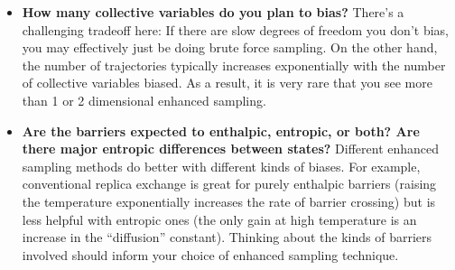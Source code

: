 \begin{itemize}
    \item \textbf{How many collective variables do you plan to bias?} There's a
    challenging tradeoff here: If there are slow degrees of freedom you don't
    bias, you may effectively just be doing brute force sampling.  On the other
    hand, the number of trajectories typically increases exponentially with the
    number of collective variables biased.  As a result, it is very rare that you see more than 1 or 2 dimensional enhanced sampling.

    \item \textbf{Are the barriers expected to enthalpic, entropic, or both? Are
    there major entropic differences between states?}  Different enhanced
    sampling methods do better with different kinds of biases.  For example,
    conventional replica exchange is great for purely enthalpic barriers
    (raising the temperature exponentially increases the rate of barrier
    crossing) but is less helpful with entropic ones (the only gain at high
    temperature is an increase in the ``diffusion'' constant).  Thinking about
    the kinds of barriers involved should inform your choice of enhanced
    sampling technique.

\end{itemize}

